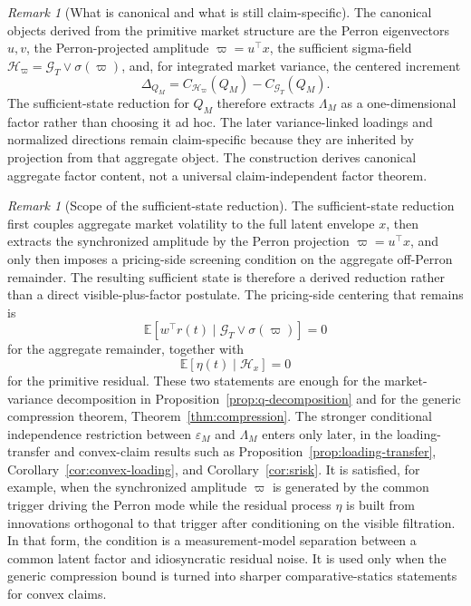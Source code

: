 \documentclass[11pt,a4paper]{amsart}
\theoremstyle{plain}
\theoremstyle{definition}
\theoremstyle{remark}
\newtheorem{remark}[theorem]{Remark}
\newcommand{\EE}{\mathbb{E}}
\newcommand{\cH}{\mathcal{H}}
\newcommand{\cG}{\mathcal{G}}
\begin{document}
\begin{remark}[What is canonical and what is still claim-specific]\label{rem:canonical-factor}
The canonical objects derived from the primitive market structure are the Perron eigenvectors
\(u,v\), the Perron-projected amplitude \(\varpi=u^\top x\), the sufficient sigma-field
\(\cH_\varpi=\cG_T\vee \sigma(\varpi)\), and, for integrated market variance, the centered increment
\[
        \Delta_{Q_M}=C_{\cH_\varpi}(Q_M)-C_{\cG_T}(Q_M).
\]
The sufficient-state reduction for \(Q_M\) therefore extracts \(\Lambda_M\) as a one-dimensional
factor rather than choosing it ad hoc.  The later variance-linked
loadings and normalized directions remain claim-specific because they are inherited by projection
from that aggregate object.  The construction derives canonical aggregate factor content, not a
universal claim-independent factor theorem.
\end{remark}

\begin{remark}[Scope of the sufficient-state reduction]\label{rem:visible-aggregate-defense}
The sufficient-state reduction first couples aggregate market volatility to the full latent envelope
\(x\), then extracts the synchronized amplitude by the Perron projection \(\varpi=u^\top x\), and
only then imposes a pricing-side screening condition on the aggregate off-Perron remainder.  The
resulting sufficient state is therefore a derived reduction rather than a direct visible-plus-factor
postulate.  The pricing-side centering that remains is
\[
        \EE[w^\top r(t)\mid \cG_T\vee \sigma(\varpi)]=0
\]
for the aggregate remainder, together with
\[
        \EE[\eta(t)\mid \cH_x]=0
\]
for the primitive residual.  These two statements are enough for the market-variance decomposition
in Proposition~\ref{prop:q-decomposition} and for the generic compression theorem,
Theorem~\ref{thm:compression}.  The stronger conditional independence restriction between
\(\varepsilon_M\) and \(\Lambda_M\) enters only later, in the loading-transfer and convex-claim
results such as Proposition~\ref{prop:loading-transfer}, Corollary~\ref{cor:convex-loading}, and
Corollary~\ref{cor:srisk}.  It is satisfied, for example, when the synchronized amplitude
\(\varpi\) is generated by the common trigger driving the Perron mode while the residual process
\(\eta\) is built from innovations orthogonal to that trigger after conditioning on the visible
filtration.  In that form, the condition is a measurement-model separation between a common latent
factor and idiosyncratic residual noise.  It is used only when the generic compression bound is
turned into sharper comparative-statics statements for convex claims.
\end{remark}
\end{document}

